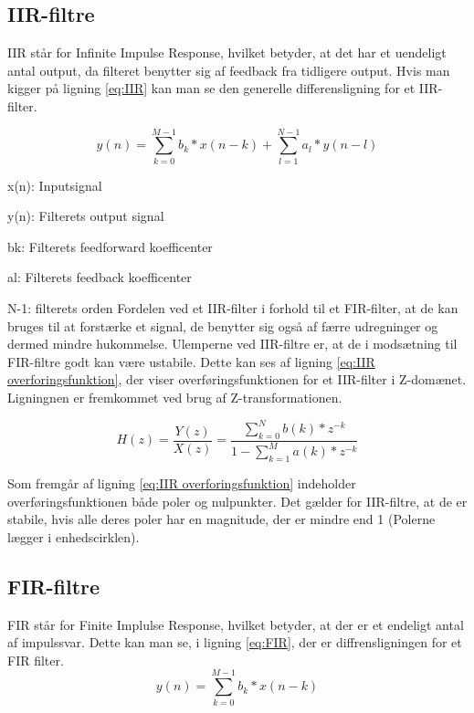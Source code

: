 \subsection{IIR-filtre}
IIR står for Infinite Impulse Response, hvilket betyder, at det har et uendeligt antal output, da filteret benytter sig af feedback fra tidligere output. Hvis man kigger på ligning \eqref{eq:IIR} kan man se den generelle differensligning for et IIR-filter.


\begin{equation}\label{eq:IIR}
{y(n)} = \displaystyle\sum_{k=0}^{M-1} {b_{k}*x(n-k)}+\displaystyle\sum_{l=1}^{N-1} {a_{l}*y(n-l)}
\end{equation}

x(n): Inputsignal

y(n): Filterets output signal

b{k}: Filterets feedforward koefficenter

a{l}: Filterets feedback koefficenter

N-1: filterets orden
\newline
\newline
Fordelen ved et IIR-filter i forhold til et FIR-filter, at de kan bruges til at forstærke et signal, de benytter sig også af færre udregninger og dermed mindre hukommelse. 
Ulemperne ved IIR-filtre er, at de i modsætning til FIR-filtre godt kan være ustabile. 
Dette kan ses af ligning \eqref{eq:IIR overforingsfunktion}, der viser overføringsfunktionen for et IIR-filter i Z-domænet. Ligningnen er fremkommet ved brug af Z-transformationen.

\begin{equation}\label{eq:IIR overforingsfunktion}
{H(z)} =\frac{Y(z)}{X(z)} =\frac{\displaystyle\sum_{k=0}^{N} {b(k)*z^{-k}}}{1-\displaystyle\sum_{k=1}^{M} {a(k)*z^{-k}}}
\end{equation}

Som fremgår af ligning \eqref{eq:IIR overforingsfunktion} indeholder overføringsfunktionen både poler og nulpunkter. Det gælder for IIR-filtre, at de er stabile, hvis alle deres poler har en magnitude, der er mindre end 1 (Polerne lægger i enhedscirklen).

\subsection{FIR-filtre}
FIR står for Finite Implulse Response, hvilket betyder, at der er et endeligt antal af impulssvar.
Dette kan man se, i ligning \eqref{eq:FIR}, der er diffrensligningen for et FIR filter.
\begin{equation}\label{eq:FIR}
{y(n)} = \displaystyle\sum_{k=0}^{M-1} {b_{k}*x(n-k)}
\end{equation}

